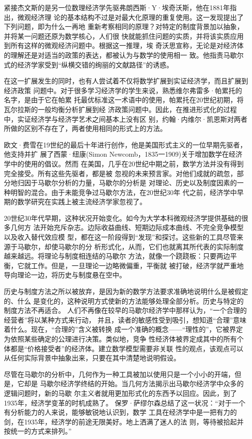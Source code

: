 紧接杰文斯的是另一位数理经济学先驱弗朗西斯·Y·埃奇沃斯，他在1881年指出，微观经济理
论的基本结构不过是对最大化原理的重复使用。这一发现提出了下列问题，即为什么一再地
重新考察相同的原理？对特定的制度背景加以抽象，并将某一问题还原为数学核心，人们很
快就能抓住问题的实质，并将该实质应用到所有这样的微观经济问题中。根据这一推理，埃
奇沃思宣称，无论是对经济体的理解还是对适当的政策的表达，都被认为与数学的使用相一
致。他指责马歇尔式的经济学家受到“纵横交错的绚丽的文献路径”的诱惑。

在这一扩展发生的同时，也有人尝试着不仅将数学扩展到实证经济学，而且扩展到经济政策
问题中。对于很多学习经济学的学生来说，熟悉维尔弗雷多·帕累托的名字，是由于它在帕累
托最优标准这一术语中的使用，帕累托在20世纪初期，将瓦尔拉斯的一般均衡分析扩展到经
济政策问题中。因此，在推进形式化的过程中，实证经济学与经济学艺术之间基本上没有区
别，约翰·内维尔·凯恩斯对两者所做的区别不存在了，两者使用相同的形式上的方法。

欧文·费雪在19世纪的最后十年进行创作，他是美国形式主义的一位早期先驱者，他支持并扩
展了西蒙·纽康(Simon Newcomb，1835一1909)关于增加数学在经济学中的使用的倡议。然而
在美国，几乎在20世纪中期之前，数学方法并没有得到完全接受。所有这些先驱者，都是被
忽视的未来预言家。对他们成就的疏忽，部分地归因于马歇尔分析的力量，马歇尔的分析是
对理论、历史以及制度因素的一种明智的混合。由于未能竞争过马歇尔方法，在20世纪30年
代之前，经济学中早期的数学研究在实践上被主流经济学家忽视了。

20世纪30年代早期，这种状况开始变化。如今为大学本科微观经济学提供基础的很多几何方
法开始充斥杂志。边际收益曲线、短期边际成本曲线、不完全竞争模型以及收入替代效应模
型，都在这一阶段得到“发现”和探讨。这些新的工具尽管来源于马歇尔，却使马歇尔的分
析形式化，从而，它们也就离其所代表的实际制度越来越远。将理论与制度相连结的马歇尔
方法，就像一个跷跷板：只要两边平衡，它就工作。但是，一旦理论一边略微偏重，平衡就
被打破，经济学就严重地导向理论一边，将历史与制度悬在空中。

历史与制度方法之所以被放弃，是因为新的数学方法要求准确地说明什么是被假定的、什么
是变化的，这种说明方式使新的方法能够处理全部分析。历史与特定的制度方法不再适合。
人们不再像在较早的马歇尔经济学中那样认为，“一个合理的经营者”将以某种方式来行动，
并且，读者的敏感性受到吸引，想知道“合理”意味着什么。现在，“合理的”含义被转换
成一个准确的概念——“理性的”，它被界定为依照某些确定的公理进行决策。类似地，竞争
性经济体被界定成其中的所有个体都是“价格接受者”的经济体。建立数学模型需要非关联
性的观点，该观点可以从任何实际背景中抽象出来，只要在其中清楚地说明假设。

尽管在马歇尔的分析中，几何作为一种工具被加以使用只是一个小小的开端，但是，它却是
马歇尔经济学终结的开始。当几何方法揭示出马歇尔经济学中众多的逻辑问题时，新的马歇
尔主义者就用更加形式化的东西予以回应。因此，到了1935年，经济学变革的时机成熟了。
保罗·萨缪尔森总结了这一状况：“对于一个有分析能力的人来说，能够敏锐地认识到，数学
工具在经济学中是一把有力的剑，在1935年，经济学的前途无限美好。地上洒满了迷人的法
则，等待被拾起并按统一的方式来排列。”

